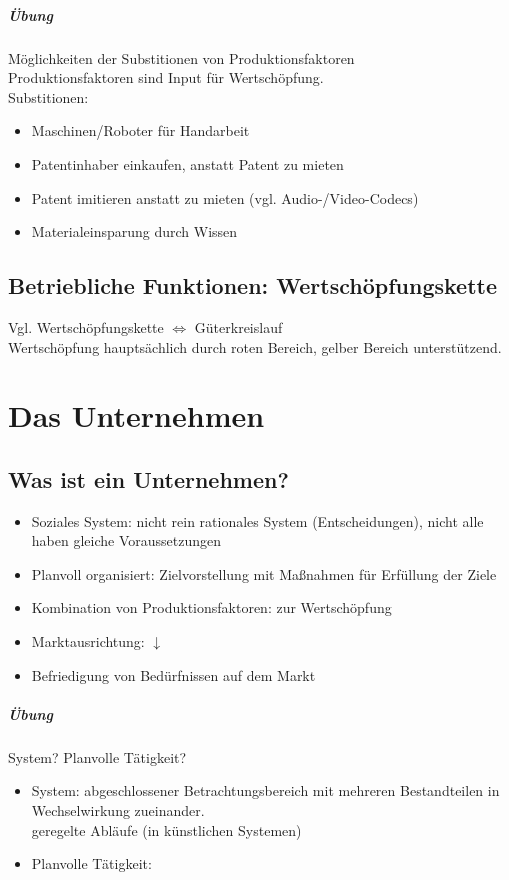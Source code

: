 \paragraph{Übung} Möglichkeiten der Substitionen von Produktionsfaktoren\\
Produktionsfaktoren sind Input für Wertschöpfung.\\
Substitionen: 
\begin{itemize}
\item Maschinen/Roboter für Handarbeit
\item Patentinhaber einkaufen, anstatt Patent zu mieten
\item Patent imitieren anstatt zu mieten (vgl. Audio-/Video-Codecs)
\item Materialeinsparung durch Wissen
\end{itemize}

\section{Betriebliche Funktionen: Wertschöpfungskette}
Vgl. Wertschöpfungskette $\Leftrightarrow$ Güterkreislauf\\
Wertschöpfung hauptsächlich durch roten Bereich, gelber Bereich unterstützend.

\chapter{Das Unternehmen}
\section{Was ist ein Unternehmen?}
\begin{itemize}
\item Soziales System: nicht rein rationales System (Entscheidungen), nicht alle haben gleiche Voraussetzungen
\item Planvoll organisiert: Zielvorstellung mit Maßnahmen für Erfüllung der Ziele
\item Kombination von Produktionsfaktoren: zur Wertschöpfung
\item Marktausrichtung: $\downarrow$
\item Befriedigung von Bedürfnissen auf dem Markt
\end{itemize}
\paragraph{Übung} System? Planvolle Tätigkeit?
\begin{itemize}
\item System: abgeschlossener Betrachtungsbereich mit mehreren Bestandteilen in Wechselwirkung zueinander.\\
geregelte Abläufe (in künstlichen Systemen)
\item Planvolle Tätigkeit: 
\end{itemize}

